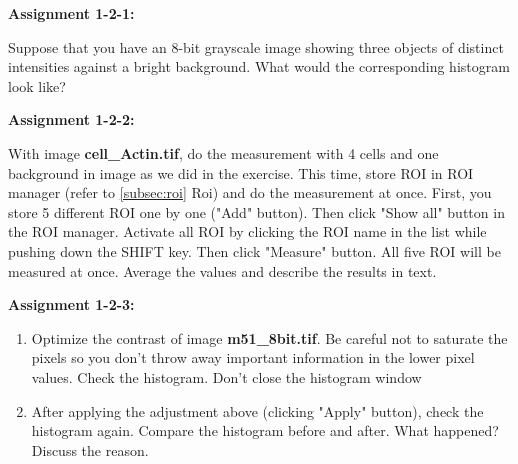 \textbf{\sffamily
Assignment 1-2-1:}

Suppose that you have an 8-bit grayscale image showing three objects of 
distinct intensities against a bright background. What would
the corresponding histogram look like?

\textbf{\sffamily
Assignment 1-2-2: }

With image \textbf{cell\_Actin.tif}, do the measurement with 4 cells and one background in image as we did in the
exercise. This time, store ROI in ROI manager (refer to \ref{subsec:roi} Roi)
and do the measurement at once. First, you store 5 different ROI one by
one ("Add" button). Then click "Show all" button in the ROI manager.
Activate all ROI by clicking the ROI name in the list while pushing
down the SHIFT key. Then click "Measure"
button. All five ROI will be measured at once. Average the values and
describe the results in text.

\textbf{\sffamily
Assignment 1-2-3: }
\begin{enumerate}
\item Optimize the contrast of image
\textbf{m51\_8bit.tif}. Be careful not to
saturate the pixels so you don't throw away important
information in the lower pixel values. Check the histogram.
Don't close the histogram window

\item After applying the adjustment above (clicking
"Apply" button), check the histogram
again. Compare the histogram before and after. What happened? Discuss
the reason.
\end{enumerate}
